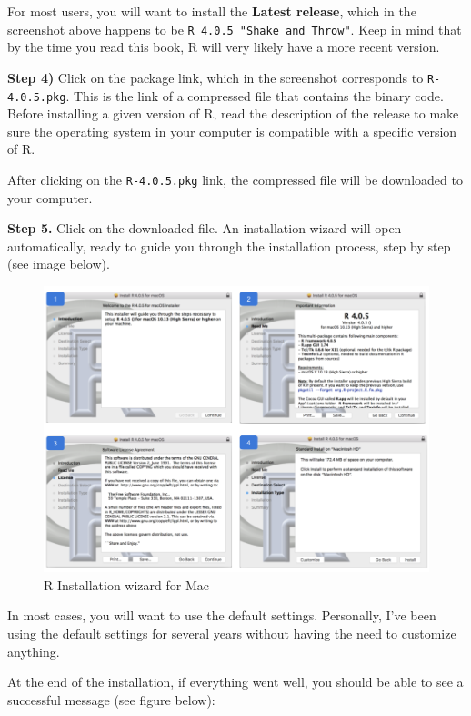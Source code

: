 \documentclass[
]{book}
\begin{document}
For most users, you will want to install the \textbf{Latest release}, which in the screenshot above happens to be \texttt{R\ 4.0.5\ "Shake\ and\ Throw"}. Keep in mind that
by the time you read this book, R will very likely have a more recent version.

\textbf{Step 4)} Click on the package link, which in the screenshot corresponds to
\texttt{R-4.0.5.pkg}. This is the link of a compressed file that contains the binary
code. Before installing a given version of R, read the
description of the release to make sure the operating system in your computer
is compatible with a specific version of R.

After clicking on the \texttt{R-4.0.5.pkg} link, the compressed file will be
downloaded to your computer.

\textbf{Step 5.} Click on the downloaded file. An installation wizard will open
automatically, ready to guide you through the installation process, step by
step (see image below).

\begin{figure}

{\centering \includegraphics[width=0.9\linewidth]{images/install/R-install-steps} 

}

\caption{R Installation wizard for Mac}\label{fig:unnamed-chunk-9}
\end{figure}

In most cases, you will want to use the default settings. Personally, I've been
using the default settings for several years without having the need to
customize anything.

At the end of the installation, if everything went well, you should be able
to see a successful message (see figure below):
\end{document}
